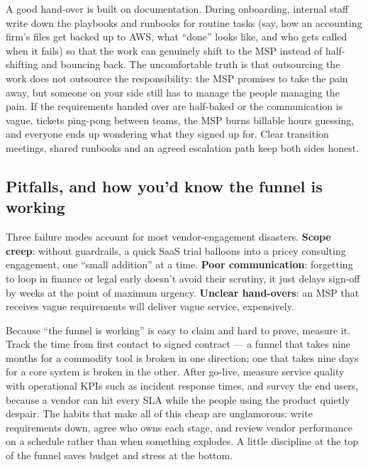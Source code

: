 A good hand-over is built on documentation. During onboarding, internal staff write down the playbooks and runbooks for routine tasks (say, how an accounting firm's files get backed up to AWS, what ``done'' looks like, and who gets called when it fails) so that the work can genuinely shift to the MSP instead of half-shifting and bouncing back. The uncomfortable truth is that outsourcing the work does not outsource the responsibility: the MSP promises to take the pain away, but someone on your side still has to manage the people managing the pain. If the requirements handed over are half-baked or the communication is vague, tickets ping-pong between teams, the MSP burns billable hours guessing, and everyone ends up wondering what they signed up for. Clear transition meetings, shared runbooks and an agreed escalation path keep both sides honest.



\subsection{Pitfalls, and how you'd know the funnel is working}


Three failure modes account for most vendor-engagement disasters. \textbf{Scope creep}: without guardrails, a quick SaaS trial balloons into a pricey consulting engagement, one ``small addition'' at a time. \textbf{Poor communication}: forgetting to loop in finance or legal early doesn't avoid their scrutiny, it just delays sign-off by weeks at the point of maximum urgency. \textbf{Unclear hand-overs}: an MSP that receives vague requirements will deliver vague service, expensively.


Because ``the funnel is working'' is easy to claim and hard to prove, measure it. Track the time from first contact to signed contract — a funnel that takes nine months for a commodity tool is broken in one direction; one that takes nine days for a core system is broken in the other. After go-live, measure service quality with operational KPIs such as incident response times, and survey the end users, because a vendor can hit every SLA while the people using the product quietly despair. The habits that make all of this cheap are unglamorous: write requirements down, agree who owns each stage, and review vendor performance on a schedule rather than when something explodes. A little discipline at the top of the funnel saves budget and stress at the bottom.



